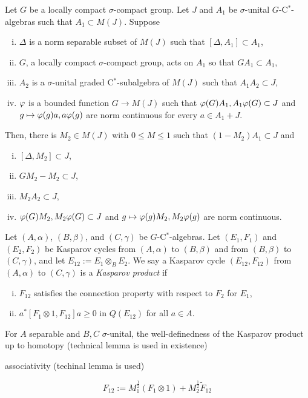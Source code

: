 \documentclass{../../large}
\begin{document}
\begin{prb}
Let $G$ be a locally compact $\sigma$-compact group.
Let $J$ and $A_1$ be $\sigma$-unital $G$-C$^*$-algebras such that $A_1\subset M(J)$.
Suppose
\begin{enumerate}[(i)]
\item $\Delta$ is a norm separable subset of $M(J)$ such that $[\Delta,A_1]\subset A_1$,
\item $G$, a locally compact $\sigma$-compact group, acts on $A_1$ so that $GA_1\subset A_1$,
\item $A_2$ is a $\sigma$-unital graded C$^*$-subalgebra of $M(J)$ such that $A_1A_2\subset J$,
\item $\varphi$ is a bounded function $G\to M(J)$ such that $\varphi(G)A_1,A_1\varphi(G)\subset J$ and $g\mapsto\varphi(g)a,a\varphi(g)$ are norm continuous for every $a\in A_1+J$.
\end{enumerate}
Then, there is $M_2\in M(J)$ with $0\le M\le1$ such that $(1-M_2)A_1\subset J$ and
\begin{enumerate}[(i)]
\item $[\Delta,M_2]\subset J$,
\item $GM_2-M_2\subset J$,
\item $M_2A_2\subset J$,
\item $\varphi(G)M_2,M_2\varphi(G)\subset J$ and $g\mapsto\varphi(g)M_2,M_2\varphi(g)$ are norm continuous.
\end{enumerate}
\end{prb}
\begin{pf}

\end{pf}

\begin{prb}
Let $(A,\alpha)$, $(B,\beta)$, and $(C,\gamma)$ be $G$-C$^*$-algebras.
Let $(E_1,F_1)$ and $(E_2,F_2)$ be Kasparov cycles from $(A,\alpha)$ to $(B,\beta)$ and from $(B,\beta)$ to $(C,\gamma)$, and let $E_{12}:=E_1\otimes_BE_2$.
We say a Kasparov cycle $(E_{12},F_{12})$ from $(A,\alpha)$ to $(C,\gamma)$ is a \emph{Kasparov product} if
\begin{enumerate}[(i)]
\item $F_{12}$ satisfies the connection property with respect to $F_2$ for $E_1$,
\item $a^*[F_1\otimes1,F_{12}]a\ge0$ in $Q(E_{12})$ for all $a\in A$.
\end{enumerate}
\begin{parts}
\item For $A$ separable and $B,C$ $\sigma$-unital, the well-definedness of the Kasparov product up to homotopy (technical lemma is used in existence)
\item associativity (techinal lemma is used)
\end{parts}
\end{prb}
\begin{pf}


\[F_{12}:=M_1^{\frac12}(F_1\otimes1)+M_2^{\frac12}\tilde F_{12}\]
\end{pf}
\end{document}
